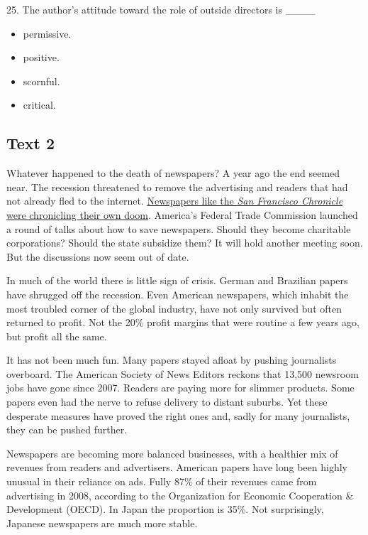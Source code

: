 \documentclass[UTF8,11pt]{ctexart}
\begin{document}
25. The author’s attitude toward the role of outside directors is \_\_\_\_


\begin{itemize}[leftmargin=2em,itemsep=.2em,topsep=.4em]\item[A.] permissive.
\item[B.] positive.
\item[C.] scornful.
\item[D.] critical.
\end{itemize}

\subsection*{\textbf{Text 2}}


Whatever happened to the death of newspapers? A year ago the end seemed near. The recession threatened to remove the advertising and readers that had not already fled to the internet. \uline{Newspapers like the }\textit{\uline{San Francisco Chronicle}}\uline{ were chronicling their own doom}. America’s Federal Trade Commission launched a round of talks about how to save newspapers. Should they become charitable corporations? Should the state subsidize them? It will hold another meeting soon. But the discussions now seem out of date.


In much of the world there is little sign of crisis. German and Brazilian papers have shrugged off the recession. Even American newspapers, which inhabit the most troubled corner of the global industry, have not only survived but often returned to profit. Not the 20\% profit margins that were routine a few years ago, but profit all the same.


It has not been much fun. Many papers stayed afloat by pushing journalists overboard. The American Society of News Editors reckons that 13,500 newsroom jobs have gone since 2007. Readers are paying more for slimmer products. Some papers even had the nerve to refuse delivery to distant suburbs. Yet these desperate measures have proved the right ones and, sadly for many journalists, they can be pushed further.


Newspapers are becoming more balanced businesses, with a healthier mix of revenues from readers and advertisers. American papers have long been highly unusual in their reliance on ads. Fully 87\% of their revenues came from advertising in 2008, according to the Organization for Economic Cooperation \& Development (OECD). In Japan the proportion is 35\%. Not surprisingly, Japanese newspapers are much more stable.
\end{document}
